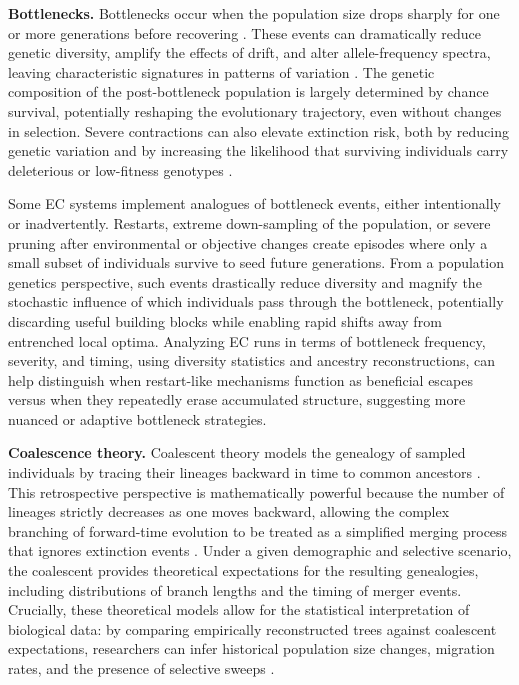 \textbf{Bottlenecks.}
Bottlenecks occur when the population size drops sharply for one or more generations before recovering \citep{hamilton2021population}.
These events can dramatically reduce genetic diversity, amplify the effects of drift, and alter allele-frequency spectra, leaving characteristic signatures in patterns of variation \citep{lynch2016genetic, kimura1985neutral, ohta1992nearly}.
The genetic composition of the post-bottleneck population is largely determined by chance survival, potentially reshaping the evolutionary trajectory, even without changes in selection.
Severe contractions can also elevate extinction risk, both by reducing genetic variation and by increasing the likelihood that surviving individuals carry deleterious or low-fitness genotypes \citep{hamilton2021population}.

Some EC systems implement analogues of bottleneck events, either intentionally or inadvertently.
Restarts, extreme down-sampling of the population, or severe pruning after environmental or objective changes create episodes where only a small subset of individuals survive to seed future generations.
From a population genetics perspective, such events drastically reduce diversity and magnify the stochastic influence of which individuals pass through the bottleneck, potentially discarding useful building blocks while enabling rapid shifts away from entrenched local optima.
Analyzing EC runs in terms of bottleneck frequency, severity, and timing, using diversity statistics and ancestry reconstructions, can help distinguish when restart-like mechanisms function as beneficial escapes versus when they repeatedly erase accumulated structure, suggesting more nuanced or adaptive bottleneck strategies.

\textbf{Coalescence theory.}
Coalescent theory models the genealogy of sampled individuals by tracing their lineages backward in time to common ancestors \citep{hamilton2021population}.
This retrospective perspective is mathematically powerful because the number of lineages strictly decreases as one moves backward, allowing the complex branching of forward-time evolution to be treated as a simplified merging process that ignores extinction events \citep{kingman1982coalescent}.
Under a given demographic and selective scenario, the coalescent provides theoretical expectations for the resulting genealogies, including distributions of branch lengths and the timing of merger events.
Crucially, these theoretical models allow for the statistical interpretation of biological data: by comparing empirically reconstructed trees against coalescent expectations, researchers can infer historical population size changes, migration rates, and the presence of selective sweeps \citep{wakeley2009coalescent}.

